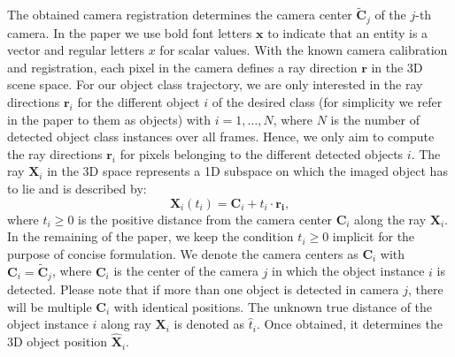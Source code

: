 The obtained camera registration determines the camera center $\mathbf{\tilde{C}}_j$ of the $j$-th camera. In the paper we use bold font letters ${\mathbf x}$ to indicate that an entity is a vector and regular letters $x$ for scalar values. With the known camera calibration and registration, each pixel in the camera defines a ray direction $\mathbf{r}$ in the 3D scene  space. For our object class trajectory, we are only interested in the ray directions $\mathbf r_i$ for the different object $i$  of the desired class (for simplicity we refer in the paper to them as objects) with  $i =1, \dots, N$, where $N$ is the number of detected object class instances  over all frames. Hence, we only aim to compute the ray directions $\mathbf{r}_i$ for pixels belonging to the different detected objects $i$. The ray $\mathbf{X}_i$ in the 3D space represents a 1D subspace on which the imaged object has to lie and is described by:
\begin{equation}
\label{eq:ray}
\mathbf{X}_i(t_i)=\mathbf{C}_i + t_i \cdot \mathbf{r_i},
\end{equation}
where $t_i \geq 0$ is the positive distance from the camera center $\mathbf{C}_i$ along the ray $\mathbf{X}_i$.
In the remaining of the paper, we keep the condition $t_i \geq 0$ implicit for the purpose of concise formulation.
We denote the camera centers as $\mathbf{C}_i$  with $\mathbf{C}_i =\mathbf{\tilde{C}}_j$, where $\mathbf{C}_i$ is the center of the camera $j$ in which the object instance $i$ is detected. Please note that if more than one object is detected in camera $j$, there will be multiple $\mathbf{C}_i$ with identical positions. The unknown true distance of the object instance $i$ along ray $\mathbf{X}_i$ is denoted as $\hat{t}_i$. Once obtained, it determines the 3D object position $\mathbf{\hat{X}}_i$. %


